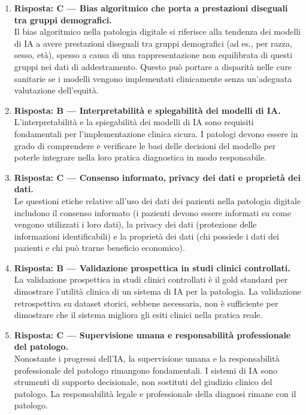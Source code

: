 \begin{enumerate}

    \item \textbf{Risposta: C --- Bias algoritmico che porta a prestazioni diseguali tra gruppi
    demografici.}\\
    Il bias algoritmico nella patologia digitale si riferisce alla tendenza dei modelli di IA a
    avere prestazioni diseguali tra gruppi demografici (ad es., per razza, sesso, età), spesso
    a causa di una rappresentazione non equilibrata di questi gruppi nei dati di addestramento.
    Questo può portare a disparità nelle cure sanitarie se i modelli vengono implementati
    clinicamente senza un'adeguata valutazione dell'equità.

    \item \textbf{Risposta: B --- Interpretabilità e spiegabilità dei modelli di IA.}\\
    L'interpretabilità e la spiegabilità dei modelli di IA sono requisiti fondamentali per
    l'implementazione clinica sicura. I patologi devono essere in grado di comprendere e
    verificare le basi delle decisioni del modello per poterle integrare nella loro pratica
    diagnostica in modo responsabile.

    \item \textbf{Risposta: C --- Consenso informato, privacy dei dati e proprietà dei dati.}\\
    Le questioni etiche relative all'uso dei dati dei pazienti nella patologia digitale includono
    il consenso informato (i pazienti devono essere informati su come vengono utilizzati i loro
    dati), la privacy dei dati (protezione delle informazioni identificabili) e la proprietà dei
    dati (chi possiede i dati dei pazienti e chi può trarne beneficio economico).

    \item \textbf{Risposta: B --- Validazione prospettica in studi clinici controllati.}\\
    La validazione prospettica in studi clinici controllati è il gold standard per dimostrare
    l'utilità clinica di un sistema di IA per la patologia. La validazione retrospettiva su
    dataset storici, sebbene necessaria, non è sufficiente per dimostrare che il sistema migliora
    gli esiti clinici nella pratica reale.

    \item \textbf{Risposta: C --- Supervisione umana e responsabilità professionale del patologo.}\\
    Nonostante i progressi dell'IA, la supervisione umana e la responsabilità professionale del
    patologo rimangono fondamentali. I sistemi di IA sono strumenti di supporto decisionale, non
    sostituti del giudizio clinico del patologo. La responsabilità legale e professionale della
    diagnosi rimane con il patologo.


\end{enumerate}
